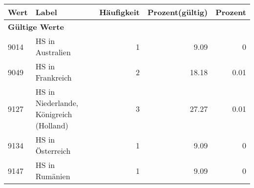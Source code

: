      \begin{longtable}{lXrrr}
     \toprule
     \textbf{Wert} & \textbf{Label} & \textbf{Häufigkeit} & \textbf{Prozent(gültig)} & \textbf{Prozent} \\
     \endhead
     \midrule
     \multicolumn{5}{l}{\textbf{Gültige Werte}}\\

     9014 &
     \multicolumn{1}{X}{ HS in Australien   } &


       \num{1} &
       \num[round-mode=places,round-precision=2]{9.09} &
         \num[round-mode=places,round-precision=2]{0} \\

     9049 &
     \multicolumn{1}{X}{ HS in Frankreich   } &


       \num{2} &
       \num[round-mode=places,round-precision=2]{18.18} &
         \num[round-mode=places,round-precision=2]{0.01} \\

     9127 &
     \multicolumn{1}{X}{ HS in Niederlande, Königreich (Holland)   } &


       \num{3} &
       \num[round-mode=places,round-precision=2]{27.27} &
         \num[round-mode=places,round-precision=2]{0.01} \\

     9134 &
     \multicolumn{1}{X}{ HS in Österreich   } &


       \num{1} &
       \num[round-mode=places,round-precision=2]{9.09} &
         \num[round-mode=places,round-precision=2]{0} \\

     9147 &
     \multicolumn{1}{X}{ HS in Rumänien   } &


       \num{1} &
       \num[round-mode=places,round-precision=2]{9.09} &
         \num[round-mode=places,round-precision=2]{0} \\


\end{longtable}
